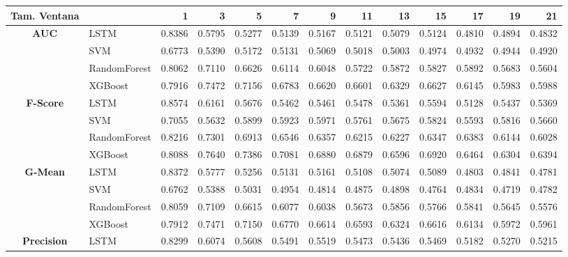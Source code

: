 \begin{table}[h]
	\centering
	\begin{adjustbox}{max width=15cm}
		\begin{tabular}{|c|l|r|r|r|r|r|r|r|r|r|r|r|}
			\hline
			\textbf{Tam. Ventana}&         &      1  &      3  &      5  &      7  &      9  &      11 &      13 &      15 &      17 &      19 &      21 \\
			\hline
			\textbf{AUC} & LSTM &  0.8386 &  0.5795 &  0.5277 &  0.5139 &  0.5167 &  0.5121 &  0.5079 &  0.5124 &  0.4810 &  0.4894 &  0.4832 \\
			& SVM &  0.6773 &  0.5390 &  0.5172 &  0.5131 &  0.5069 &  0.5018 &  0.5003 &  0.4974 &  0.4932 &  0.4944 &  0.4920 \\
			& RandomForest &  0.8062 &  0.7110 &  0.6626 &  0.6114 &  0.6048 &  0.5722 &  0.5872 &  0.5827 &  0.5892 &  0.5683 &  0.5604 \\
			& XGBoost &  0.7916 &  0.7472 &  0.7156 &  0.6783 &  0.6620 &  0.6601 &  0.6329 &  0.6627 &  0.6145 &  0.5983 &  0.5988 \\
			\hline
			\textbf{F-Score} & LSTM &  0.8574 &  0.6161 &  0.5676 &  0.5462 &  0.5461 &  0.5478 &  0.5361 &  0.5594 &  0.5128 &  0.5437 &  0.5369 \\
			& SVM &  0.7055 &  0.5632 &  0.5899 &  0.5923 &  0.5971 &  0.5761 &  0.5675 &  0.5824 &  0.5593 &  0.5816 &  0.5660 \\
			& RandomForest &  0.8216 &  0.7301 &  0.6913 &  0.6546 &  0.6357 &  0.6215 &  0.6227 &  0.6347 &  0.6383 &  0.6144 &  0.6028 \\
			& XGBoost &  0.8088 &  0.7640 &  0.7386 &  0.7081 &  0.6880 &  0.6879 &  0.6596 &  0.6920 &  0.6464 &  0.6304 &  0.6394 \\
			\hline
			\textbf{G-Mean} & LSTM &  0.8372 &  0.5777 &  0.5256 &  0.5131 &  0.5161 &  0.5108 &  0.5074 &  0.5089 &  0.4803 &  0.4841 &  0.4781 \\
			& SVM &  0.6762 &  0.5388 &  0.5031 &  0.4954 &  0.4814 &  0.4875 &  0.4898 &  0.4764 &  0.4834 &  0.4719 &  0.4782 \\
			& RandomForest &  0.8059 &  0.7109 &  0.6615 &  0.6077 &  0.6038 &  0.5673 &  0.5856 &  0.5766 &  0.5841 &  0.5645 &  0.5576 \\
			& XGBoost &  0.7912 &  0.7471 &  0.7150 &  0.6770 &  0.6614 &  0.6593 &  0.6324 &  0.6616 &  0.6134 &  0.5972 &  0.5961 \\
			\hline
			\textbf{Precision} & LSTM &  0.8299 &  0.6074 &  0.5608 &  0.5491 &  0.5519 &  0.5473 &  0.5436 &  0.5469 &  0.5182 &  0.5270 &  0.5215 \\

\end{tabular}
\end{adjustbox}
\end{table}
